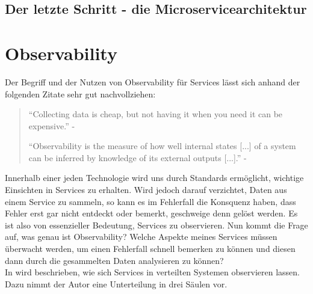 \subsection{Der letzte Schritt - die Microservicearchitektur}
\autocite{Silveira2016}



\section{Observability}

Der Begriff und der Nutzen von Observability für Services lässt sich anhand der folgenden Zitate sehr gut nachvollziehen:

\begin{quote}
	\enquote{Collecting data is cheap, but not having it when you need it can be expensive.}\autocite[S. 373]{microservice_enterprise} - \textit{\citeauthor{microservice_enterprise}}

	\enquote{Observability is the measure of how well internal states [...] of a system can be inferred by knowledge of its external outputs [...].}\autocite[S. 35]{Yordanova2016} - \textit{\citeauthor{Yordanova2016}}
\end{quote}

Innerhalb einer jeden Technologie wird uns durch Standards  ermöglicht, wichtige Einsichten in Services zu erhalten. Wird jedoch darauf verzichtet, Daten aus einem Service zu sammeln, so kann es im Fehlerfall die Konsquenz haben, dass Fehler erst gar nicht entdeckt oder bemerkt, geschweige denn gelöst werden. Es ist also von essenzieller Bedeutung, Services zu observieren. Nun kommt die Frage auf, was genau ist Observability? Welche Aspekte meines Services müssen überwacht werden, um einen Fehlerfall schnell bemerken zu können und diesen dann durch die gesammelten Daten analysieren zu können?\\
In  wird beschrieben, wie sich Services in verteilten Systemen observieren lassen. Dazu nimmt der Autor eine Unterteilung in drei Säulen vor.


